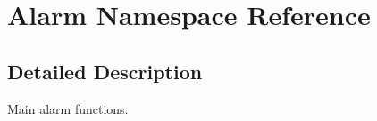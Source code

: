 \hypertarget{namespaceAlarm}{}\section{Alarm Namespace Reference}
\label{namespaceAlarm}


\subsection{Detailed Description}
Main alarm functions. 